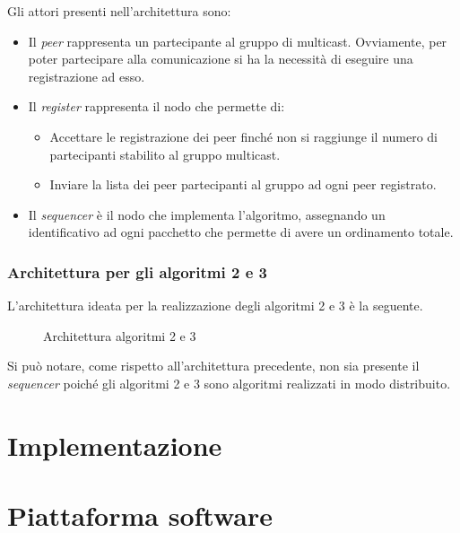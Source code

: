 \documentclass[acmtog]{acmart}
\begin{document}
Gli attori presenti nell'architettura sono:
\begin{itemize}
\item Il \textit{peer} rappresenta un partecipante al gruppo di multicast. Ovviamente, per poter partecipare alla comunicazione si ha la necessità di eseguire una registrazione ad esso.
\item Il \textit{register} rappresenta il nodo che permette di:
\begin{itemize}
\item Accettare le registrazione dei peer finché non si raggiunge il numero di partecipanti stabilito al gruppo multicast.
\item Inviare la lista dei peer partecipanti al gruppo ad ogni peer registrato.
\end{itemize}
\item Il \textit{sequencer} è il nodo che implementa l'algoritmo, assegnando un identificativo ad ogni pacchetto che permette di avere un ordinamento totale.
\end{itemize}

\subsubsection{Architettura per gli algoritmi 2 e 3}
L'architettura ideata per la realizzazione degli algoritmi 2 e 3 è la seguente.
\begin{figure}[ht!]
\centering
{}
\caption{Architettura algoritmi 2 e 3}
\end{figure}

Si può notare, come rispetto all'architettura precedente, non sia presente il \textit{sequencer} poiché gli algoritmi 2 e 3 sono algoritmi realizzati in modo distribuito.

\section{Implementazione}

\section{Piattaforma software}
\end{document}
